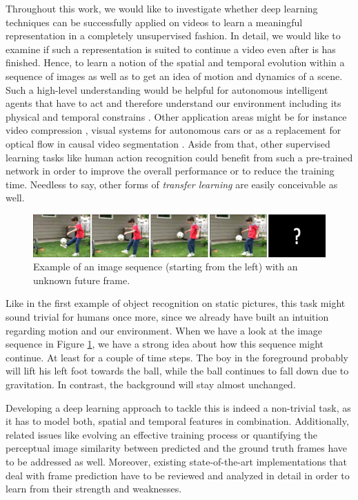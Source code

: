 Throughout this work, we would like to investigate whether deep learning techniques can be successfully applied on videos to learn a meaningful representation in a completely unsupervised fashion. In detail, we would like to examine if such a representation is suited to continue a video even after is has finished. Hence, to learn a notion of the spatial and temporal evolution within a sequence of images as well as to get an idea of motion and dynamics of a scene. Such a high-level understanding would be helpful for autonomous intelligent agents that have to act and therefore understand our environment including its physical and temporal constrains \parencite{unsup_learn_lstm}. Other application areas might be for instance video compression \parencite{frame_interpol}, visual systems for autonomous cars or as a replacement for optical flow in causal video segmentation \parencite{causal_video_seg}. Aside from that, other supervised learning tasks like human action recognition could benefit from such a pre-trained network in order to improve the overall performance or to reduce the training time. Needless to say, other forms of \textit{transfer learning} are easily conceivable as well.

\begin{figure}[htpb]
	\centering
	\includegraphics[width=1.0\linewidth]{figures/ucf-intro/serie1.png} 
	\caption[Example Image Sequence]{Example of an image sequence (starting from the left) with an unknown future frame.} \label{fig:intro-seq}
\end{figure}

Like in the first example of object recognition on static pictures, this task might sound trivial for humans once more, since we already have built an intuition regarding motion and our environment. When we have a look at the image sequence in Figure \ref{fig:intro-seq}, we have a strong idea about how this sequence might continue. At least for a couple of time steps. The boy in the foreground probably will lift his left foot towards the ball, while the ball continues to fall down due to gravitation. In contrast, the background will stay almost unchanged.

Developing a deep learning approach to tackle this is indeed a non-trivial task, as it has to model both, spatial and temporal features in combination. Additionally, related issues like evolving an effective training process or quantifying the perceptual image similarity between predicted and the ground truth frames have to be addressed as well. Moreover, existing state-of-the-art implementations that deal with frame prediction have to be reviewed and analyzed in detail in order to learn from their strength and weaknesses.


